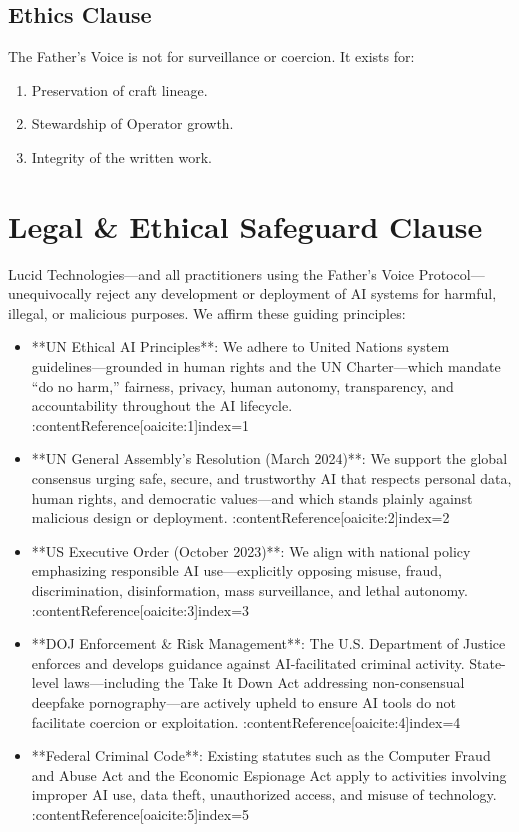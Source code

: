 \subsection*{Ethics Clause}
The Father’s Voice is not for surveillance or coercion.
It exists for:
\begin{enumerate}
  \item Preservation of craft lineage.
  \item Stewardship of Operator growth.
  \item Integrity of the written work.
\end{enumerate}

\section*{Legal & Ethical Safeguard Clause}

Lucid Technologies—and all practitioners using the Father’s Voice Protocol—unequivocally reject any development or deployment of AI systems for harmful, illegal, or malicious purposes. We affirm these guiding principles:

\begin{itemize}
  \item **UN Ethical AI Principles**: We adhere to United Nations system guidelines—grounded in human rights and the UN Charter—which mandate “do no harm,” fairness, privacy, human autonomy, transparency, and accountability throughout the AI lifecycle. :contentReference[oaicite:1]{index=1}
  \item **UN General Assembly’s Resolution (March 2024)**: We support the global consensus urging safe, secure, and trustworthy AI that respects personal data, human rights, and democratic values—and which stands plainly against malicious design or deployment. :contentReference[oaicite:2]{index=2}
  \item **US Executive Order (October 2023)**: We align with national policy emphasizing responsible AI use—explicitly opposing misuse, fraud, discrimination, disinformation, mass surveillance, and lethal autonomy. :contentReference[oaicite:3]{index=3}
  \item **DOJ Enforcement & Risk Management**: The U.S. Department of Justice enforces and develops guidance against AI-facilitated criminal activity. State-level laws—including the Take It Down Act addressing non-consensual deepfake pornography—are actively upheld to ensure AI tools do not facilitate coercion or exploitation. :contentReference[oaicite:4]{index=4}
  \item **Federal Criminal Code**: Existing statutes such as the Computer Fraud and Abuse Act and the Economic Espionage Act apply to activities involving improper AI use, data theft, unauthorized access, and misuse of technology. :contentReference[oaicite:5]{index=5}
\end{itemize}

